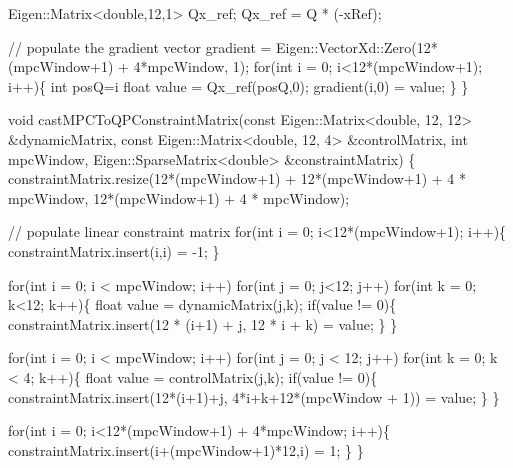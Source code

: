 \begin{DoxyCodeInclude}
    Eigen::Matrix<double,12,1> Qx\_ref;
    Qx\_ref = Q * (-xRef);

    \textcolor{comment}{// populate the gradient vector}
    gradient = Eigen::VectorXd::Zero(12*(mpcWindow+1) +  4*mpcWindow, 1);
    \textcolor{keywordflow}{for}(\textcolor{keywordtype}{int} i = 0; i<12*(mpcWindow+1); i++)\{
        \textcolor{keywordtype}{int} posQ=i%
        \textcolor{keywordtype}{float} value = Qx\_ref(posQ,0);
        gradient(i,0) = value;
    \}
\}

\textcolor{keywordtype}{void} castMPCToQPConstraintMatrix(\textcolor{keyword}{const} Eigen::Matrix<double, 12, 12> &dynamicMatrix, \textcolor{keyword}{const} 
      Eigen::Matrix<double, 12, 4> &controlMatrix,
                                 \textcolor{keywordtype}{int} mpcWindow, Eigen::SparseMatrix<double> &constraintMatrix)
\{
    constraintMatrix.resize(12*(mpcWindow+1)  + 12*(mpcWindow+1) + 4 * mpcWindow, 12*(mpcWindow+1) + 4 * 
      mpcWindow);

    \textcolor{comment}{// populate linear constraint matrix}
    \textcolor{keywordflow}{for}(\textcolor{keywordtype}{int} i = 0; i<12*(mpcWindow+1); i++)\{
        constraintMatrix.insert(i,i) = -1;
    \}

    \textcolor{keywordflow}{for}(\textcolor{keywordtype}{int} i = 0; i < mpcWindow; i++)
        \textcolor{keywordflow}{for}(\textcolor{keywordtype}{int} j = 0; j<12; j++)
            \textcolor{keywordflow}{for}(\textcolor{keywordtype}{int} k = 0; k<12; k++)\{
                \textcolor{keywordtype}{float} value = dynamicMatrix(j,k);
                \textcolor{keywordflow}{if}(value != 0)\{
                    constraintMatrix.insert(12 * (i+1) + j, 12 * i + k) = value;
                \}
            \}

    \textcolor{keywordflow}{for}(\textcolor{keywordtype}{int} i = 0; i < mpcWindow; i++)
        \textcolor{keywordflow}{for}(\textcolor{keywordtype}{int} j = 0; j < 12; j++)
            \textcolor{keywordflow}{for}(\textcolor{keywordtype}{int} k = 0; k < 4; k++)\{
                \textcolor{keywordtype}{float} value = controlMatrix(j,k);
                \textcolor{keywordflow}{if}(value != 0)\{
                    constraintMatrix.insert(12*(i+1)+j, 4*i+k+12*(mpcWindow + 1)) = value;
                \}
            \}

    \textcolor{keywordflow}{for}(\textcolor{keywordtype}{int} i = 0; i<12*(mpcWindow+1) + 4*mpcWindow; i++)\{
        constraintMatrix.insert(i+(mpcWindow+1)*12,i) = 1;
    \}
\}


\end{DoxyCodeInclude}
